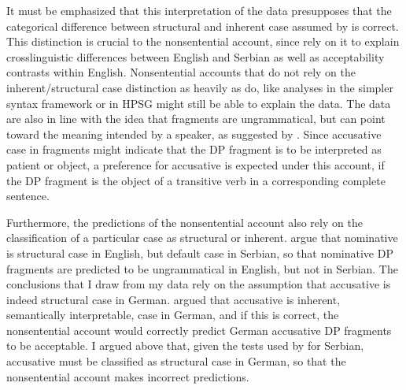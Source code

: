 It must be emphasized that this interpretation of the data presupposes that the categorical difference between structural and inherent case assumed by \citet{barton.progovac2005} is correct. This distinction is crucial to the nonsentential account, since \citet{barton.progovac2005} rely on it to explain crosslinguistic differences between English and Serbian as well as acceptability contrasts within English. Nonsentential accounts that do not rely on the inherent/structural case distinction as heavily as \citet{barton.progovac2005} do, like analyses in the simpler syntax framework \citep{culicover.jackendoff2005} or in HPSG \citep{ginzburg.sag2000, fernandez.ginzburg2002} might still be able to explain the data. The data are also in line with the idea that fragments are ungrammatical, but can point toward the meaning intended by a speaker, as suggested by \citet{bergen.goodman2015}. Since accusative case in fragments might indicate that the DP fragment is to be interpreted as patient or object, a preference for accusative is expected under this account, if the DP fragment is the object of a transitive verb in a corresponding complete sentence. 

Furthermore, the predictions of the nonsentential account also rely on the classification of a particular case as structural or inherent. \citet{barton.progovac2005} argue that nominative is structural case in English, but default case in Serbian, so that nominative DP fragments are predicted to be ungrammatical in English, but not in Serbian. The conclusions that I draw from my data rely on the assumption that accusative is indeed structural case in German. \citet{progovac.etal2006} argued that accusative is inherent, semantically interpretable, case in German, and if this is correct, the nonsentential account would correctly predict German accusative DP fragments to be acceptable. I argued above that, given the tests used by \citet{progovac.etal2006} for Serbian, accusative must be classified as structural case in German, so that the nonsentential account makes incorrect predictions. 

